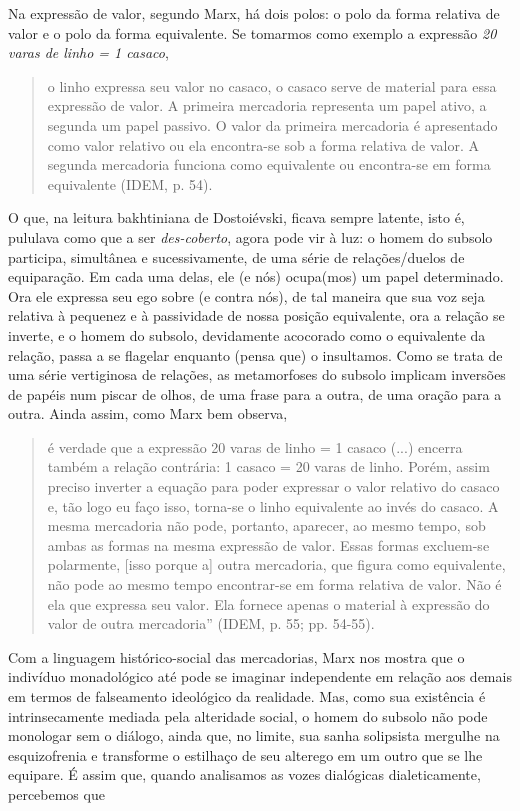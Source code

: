 Na expressão de valor, segundo Marx, há dois polos: o polo da forma
relativa de valor e o polo da forma equivalente. Se tomarmos como
exemplo a expressão \emph{20 varas de linho = 1 casaco},

\begin{quote}
o linho expressa seu valor no casaco, o casaco serve de material para
essa expressão de valor. A primeira mercadoria representa um papel
ativo, a segunda um papel passivo. O valor da primeira mercadoria é
apresentado como valor relativo ou ela encontra-se sob a forma relativa
de valor. A segunda mercadoria funciona como equivalente ou encontra-se
em forma equivalente (IDEM, p. 54).
\end{quote}

O que, na leitura bakhtiniana de Dostoiévski, ficava sempre latente,
isto é, pululava como que a ser \emph{des-coberto}, agora pode vir à
luz: o homem do subsolo participa, simultânea e sucessivamente, de uma
série de relações/duelos de equiparação. Em cada uma delas, ele (e nós)
ocupa(mos) um papel determinado. Ora ele expressa seu ego sobre (e
contra nós), de tal maneira que sua voz seja relativa à pequenez e à
passividade de nossa posição equivalente, ora a relação se inverte, e o
homem do subsolo, devidamente acocorado como o equivalente da relação,
passa a se flagelar enquanto (pensa que) o insultamos. Como se trata de
uma série vertiginosa de relações, as metamorfoses do subsolo implicam
inversões de papéis num piscar de olhos, de uma frase para a outra, de
uma oração para a outra. Ainda assim, como Marx bem observa,

\begin{quote}
é verdade que a expressão 20 varas de linho = 1 casaco (...) encerra
também a relação contrária: 1 casaco = 20 varas de linho. Porém, assim
preciso inverter a equação para poder expressar o valor relativo do
casaco e, tão logo eu faço isso, torna-se o linho equivalente ao invés
do casaco. A mesma mercadoria não pode, portanto, aparecer, ao mesmo
tempo, sob ambas as formas na mesma expressão de valor. Essas formas
excluem-se polarmente, {[}isso porque a{]} outra mercadoria, que figura
como equivalente, não pode ao mesmo tempo encontrar-se em forma relativa
de valor. Não é ela que expressa seu valor. Ela fornece apenas o
material à expressão do valor de outra mercadoria'' (IDEM, p. 55; pp.
54-55).
\end{quote}

Com a linguagem histórico-social das mercadorias, Marx nos mostra que o
indivíduo monadológico até pode se imaginar independente em relação aos
demais em termos de falseamento ideológico da realidade. Mas, como sua
existência é intrinsecamente mediada pela alteridade social, o homem do
subsolo não pode monologar sem o diálogo, ainda que, no limite, sua
sanha solipsista mergulhe na esquizofrenia e transforme o estilhaço de
seu alterego em um outro que se lhe equipare. É assim que, quando
analisamos as vozes dialógicas dialeticamente, percebemos que

